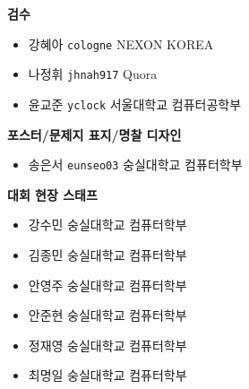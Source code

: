     \begin{frame}%
        \textbf{검수} %
        \begin{itemize}
            \item 강혜아 \tabto{1.2cm} \texttt{cologne} \tabto{8cm} {\color{gray} NEXON KOREA}
            \item 나정휘 \tabto{1.2cm} \texttt{jhnah917} \tabto{8cm} {\color{gray} Quora}
            \item 윤교준 \tabto{1.2cm} \texttt{yclock} \tabto{8cm} {\color{gray} 서울대학교 컴퓨터공학부}
        \end{itemize}
        \vspace{3mm}
        \textbf{포스터/문제지 표지/명찰 디자인} %
        \begin{itemize}
            \item 송은서 \tabto{1.2cm} \texttt{eunseo03} \tabto{8cm} {\color{gray} 숭실대학교 컴퓨터학부}
        \end{itemize}
    \end{frame}
    
    \begin{frame}%
        \textbf{대회 현장 스태프} %
        \begin{itemize}
            \item 강수민 \tabto{1.2cm} \texttt{} \tabto{8cm} {\color{gray} 숭실대학교 컴퓨터학부}
            \item 김종민 \tabto{1.2cm} \texttt{} \tabto{8cm} {\color{gray} 숭실대학교 컴퓨터학부}
            \item 안영주 \tabto{1.2cm} \texttt{} \tabto{8cm} {\color{gray} 숭실대학교 컴퓨터학부}
            \item 안준현 \tabto{1.2cm} \texttt{} \tabto{8cm} {\color{gray} 숭실대학교 컴퓨터학부}
            \item 정재영 \tabto{1.2cm} \texttt{} \tabto{8cm} {\color{gray} 숭실대학교 컴퓨터학부}
            \item 최명일 \tabto{1.2cm} \texttt{} \tabto{8cm} {\color{gray} 숭실대학교 컴퓨터학부}
        \end{itemize}
    \end{frame}
    

